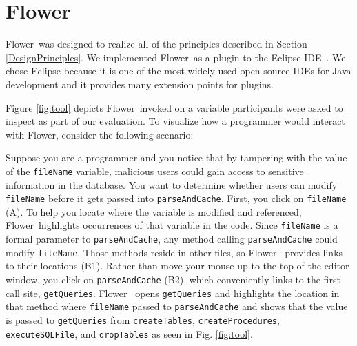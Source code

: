 \documentclass[conference]{IEEEtran}
\newcommand{\toolName}{Flower}
\begin{document}
\section{\toolName}
\toolName~was designed to realize all of the principles described in Section \ref{DesignPrinciples}. 
We implemented \toolName~as a plugin to the Eclipse IDE~\cite{Eclipse}. 
We chose Eclipse because it is one of the most widely used open source IDEs for Java development and it provides many extension points for plugins. 

Figure \ref{fig:tool} depicts \toolName~invoked on a variable participants were asked to inspect as part of our evaluation. To visualize how a programmer would interact with \toolName, consider the following scenario:


Suppose you are a programmer and you notice that by tampering with the value of the \texttt{fileName} variable, malicious users could gain access to sensitive information in the database. 
You want to determine whether users can modify \texttt{fileName} before it gets passed into \texttt{parseAndCache}. 
First, you click on \texttt{fileName} (A). 
To help you locate where the variable is modified and referenced, \toolName~highlights occurrences of that variable in the code.
Since \texttt{fileName} is a formal parameter to \texttt{parseAndCache}, any method calling \texttt{parseAndCache} could modify \texttt{fileName}. 
Those methods reside in other files, so \toolName~ provides links to their locations (B1).
Rather than move your mouse up to the top of the editor window, you click on \texttt{parseAndCache} (B2), which conveniently links to the first call site, \texttt{getQueries}. 
\toolName~ opens \texttt{getQueries} and highlights the location in that method where \texttt{fileName} passed to \texttt{parseAndCache} and shows that the value is passed to \texttt{getQueries} from \texttt{createTables}, \texttt{createProcedures}, \texttt{executeSQLFile}, and \texttt{dropTables} as seen in Fig. \ref{fig:tool}.  

\end{document}
